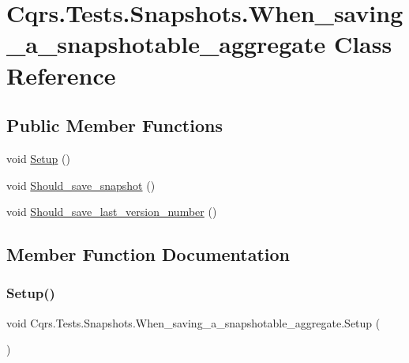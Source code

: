 \hypertarget{classCqrs_1_1Tests_1_1Snapshots_1_1When__saving__a__snapshotable__aggregate}{}\section{Cqrs.\+Tests.\+Snapshots.\+When\+\_\+saving\+\_\+a\+\_\+snapshotable\+\_\+aggregate Class Reference}
\label{classCqrs_1_1Tests_1_1Snapshots_1_1When__saving__a__snapshotable__aggregate}
\subsection*{Public Member Functions}
\begin{DoxyCompactItemize}
\item 
void \hyperlink{classCqrs_1_1Tests_1_1Snapshots_1_1When__saving__a__snapshotable__aggregate_a1a36dc6053fa80492b17dec9b95f9808}{Setup} ()
\item 
void \hyperlink{classCqrs_1_1Tests_1_1Snapshots_1_1When__saving__a__snapshotable__aggregate_a9d4c5f79d177793da371c5abd056a48d}{Should\+\_\+save\+\_\+snapshot} ()
\item 
void \hyperlink{classCqrs_1_1Tests_1_1Snapshots_1_1When__saving__a__snapshotable__aggregate_ace9f213932d96510f8556c2722a939a1}{Should\+\_\+save\+\_\+last\+\_\+version\+\_\+number} ()
\end{DoxyCompactItemize}


\subsection{Member Function Documentation}
\mbox{\label{classCqrs_1_1Tests_1_1Snapshots_1_1When__saving__a__snapshotable__aggregate_a1a36dc6053fa80492b17dec9b95f9808}} 
\subsubsection{\texorpdfstring{Setup()}{Setup()}}
{\footnotesize\ttfamily void Cqrs.\+Tests.\+Snapshots.\+When\+\_\+saving\+\_\+a\+\_\+snapshotable\+\_\+aggregate.\+Setup (\begin{DoxyParamCaption}{ }\end{DoxyParamCaption})}

